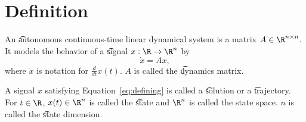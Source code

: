 
\section*{Definition}

An \t{autonomous continuous-time linear dynamical system} is a matrix $A \in \R ^{n \times  n}$.
It models the behavior of a \t{signal} $x: \R  \to \R ^n$ by
\begin{equation}
  \label{eq:defining}\dot{x} = Ax,\end{equation}
where $\dot{x}$ is notation for $\frac{d}{dt} x(t)$.
$A$ is called the \t{dynamics matrix}.

A signal $x$ satisfying Equation~\eqref{eq:defining} is called a \t{solution} or a \t{trajectory}.
For $t \in \R $, $x(t) \in \R ^n$ is called the \t{state} and $\R ^n$ is called the state space.
$n$ is called the \t{state dimension}.

\blankpage